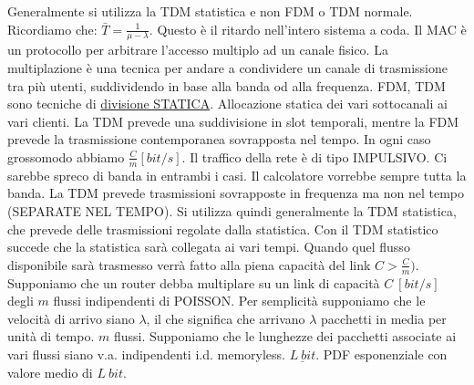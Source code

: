 Generalmente si utilizza la TDM statistica e non FDM o TDM normale. Ricordiamo che: $\bar{T}=\frac{1}{\mu-\lambda}$. Questo è il ritardo nell'intero sistema a coda. Il MAC è un protocollo per arbitrare l'accesso multiplo ad un canale fisico. La multiplazione è una tecnica per andare a condividere un canale di trasmissione tra più utenti, suddividendo in base alla banda od alla frequenza. FDM, TDM sono tecniche di \underline{divisione STATICA}. Allocazione statica dei vari sottocanali ai vari clienti. La TDM prevede una suddivisione in slot temporali, mentre la FDM prevede la trasmissione contemporanea sovrapposta nel tempo. In ogni caso grossomodo abbiamo $\frac{C}{m} [bit/s]$. Il traffico della rete è di tipo IMPULSIVO. Ci sarebbe spreco di banda in entrambi i casi. Il calcolatore vorrebbe sempre tutta la banda. La TDM prevede trasmissioni sovrapposte in frequenza ma non nel tempo (SEPARATE NEL TEMPO). Si utilizza quindi generalmente la TDM statistica, che prevede delle trasmissioni regolate dalla statistica. Con il TDM statistico succede che la statistica sarà collegata ai vari tempi. Quando quel flusso disponibile sarà trasmesso verrà fatto alla piena capacità del link $C > \frac{C}{m})$. Supponiamo che un router debba multiplare su un link di capacità $C\ [bit/s]$ degli $m$ flussi indipendenti di POISSON. Per semplicità supponiamo che le velocità di arrivo siano $\lambda$, il che significa che arrivano $\lambda$ pacchetti in media per unità di tempo. $m$ flussi. Supponiamo che le lunghezze dei pacchetti associate ai vari flussi siano v.a. indipendenti i.d. memoryless. $\underline{\mathit{L}\ bit}$. PDF esponenziale con valore medio di $\mathit{L}\ bit$.

